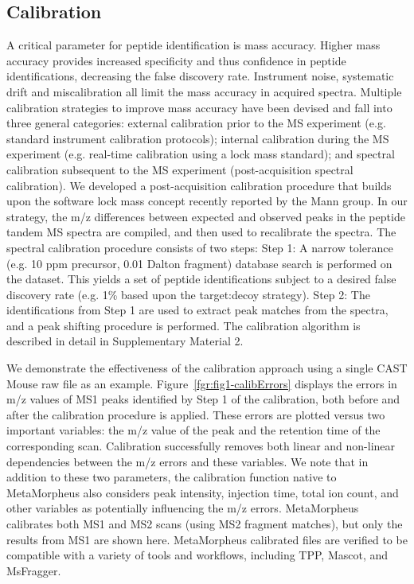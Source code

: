 \documentclass[journal=jprobs,manuscript=article]{achemso}
\begin{document}
\subsection{Calibration}

A critical parameter for peptide identification is mass accuracy\citep{Scherl_2008}.
Higher mass accuracy provides increased specificity and thus confidence in peptide identifications, decreasing the false discovery rate.
Instrument noise, systematic drift and miscalibration all limit the mass accuracy in acquired spectra.
Multiple calibration strategies to improve mass accuracy have been devised and fall into three general categories: external calibration prior to the MS experiment (e.g. standard instrument calibration protocols); internal calibration during the MS experiment (e.g. real-time calibration using a lock mass standard\citep{Olsen_2005}); and spectral calibration subsequent to the MS experiment (post-acquisition spectral calibration).
We developed a post-acquisition calibration procedure that builds upon the software lock mass concept\citep{Cox_2011} recently reported by the Mann group.
In our strategy, the m/z differences between expected and observed peaks in the peptide tandem MS spectra are compiled, and then used to recalibrate the spectra.
The spectral calibration procedure consists of two steps: Step 1: A narrow tolerance (e.g. 10 ppm precursor, 0.01 Dalton fragment) database search is performed on the dataset.
This yields a set of peptide identifications subject to a desired false discovery rate (e.g. 1\% based upon the target:decoy strategy\citep{Elias_2007}).
Step 2: The identifications from Step 1 are used to extract peak matches from the spectra, and a peak shifting procedure is performed.
The calibration algorithm is described in detail in Supplementary Material 2.

We demonstrate the effectiveness of the calibration approach using a single CAST Mouse raw file as an example.
Figure~\ref{fgr:fig1-calibErrors} displays the errors in m/z values of MS1 peaks identified by Step 1 of the calibration, both before and after the calibration procedure is applied.
These errors are plotted versus two important variables: the m/z value of the peak and the retention time of the corresponding scan.
Calibration successfully removes both linear and non-linear dependencies between the m/z errors and these variables.
We note that in addition to these two parameters, the calibration function native to MetaMorpheus also considers peak intensity, injection time, total ion count, and other variables as potentially influencing the m/z errors.
MetaMorpheus calibrates both MS1 and MS2 scans (using MS2 fragment matches), but only the results from MS1 are shown here.
MetaMorpheus calibrated files are verified to be compatible with a variety of tools and workflows, including TPP, Mascot, and MsFragger.
\end{document}
